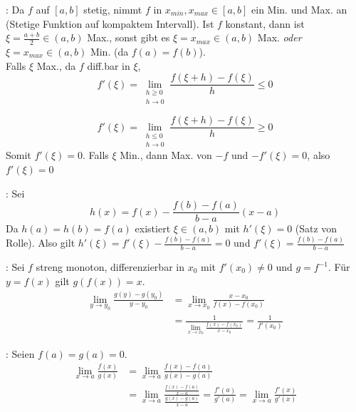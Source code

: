 \begin{minipage}{\linewidth}
\Bew {}: Da $f$ auf $[a, b]$ stetig, nimmt $f$ in $x_{min}, x_{max} \in [a, b]$
ein Min. und Max. an (Stetige Funktion auf kompaktem Intervall).
Ist $f$ konstant, dann ist $\xi = \frac{a + b}{2} \in (a,b)$ Max.,
sonst gibt es $\xi = x_{max} \in (a, b)$ Max. \textit{oder} $\xi = x_{max} \in (a, b)$ Min. (da $f(a) = f(b)$). \\
Falls $\xi$ Max., da $f$ diff.bar in $\xi$,
$$f'(\xi) = \lim_{\substack{h \ge 0 \\ h \to 0}} \frac{f(\xi + h) - f(\xi)}{h} \le 0$$

$$f'(\xi) = \lim_{\substack{h \le 0 \\ h \to 0}} \frac{f(\xi + h) - f(\xi)}{h} \ge 0$$
Somit $f'(\xi) = 0$. Falls $\xi$ Min., dann Max. von $-f$ und $-f'(\xi) = 0$, also $f'(\xi) = 0$
\end{minipage}

\begin{minipage}{\linewidth}
\Bew {}: Sei
$$h(x) = f(x) - \frac{f(b) - f(a)}{b - a} (x- a)$$
Da $h(a) = h(b) = f(a)$ existiert $\xi \in (a, b)$ mit $h'(\xi) = 0$ (Satz von Rolle).
Also gilt $h'(\xi) = f'(\xi) - \frac{f(b) - f(a)}{b - a} = 0$
und $f'(\xi) = \frac{f(b) - f(a)}{b - a}$
\end{minipage}

\begin{minipage}{\linewidth}
\Bew {}: Sei $f$ streng monoton, differenzierbar in $x_0$ mit $f'(x_0) \neq 0$ und $g = f^{-1}$. Für $y = f(x)$ gilt $g(f(x)) = x$.
\begin{align*}
    \lim_{y \to y_0} \frac{g(y) - g(y_0)}{y - y_0} &= \lim_{x \to x_0} \frac{x - x_0}{f(x) - f(x_0)} \\[-0.6em]
    &= \frac{1}{\lim_{x \to x_0} \frac{f(x) - f(x_0)}{x - x_0}} = \frac{1}{f'(x_0)}
\end{align*}
\end{minipage}

\Bew {}: Seien $f(a)=g(a)=0$.
\begin{align*}
    \lim_{x \to a} \frac{f(x)}{g(x)} &= \lim_{x \to a} \frac{f(x) - f(a)}{g(x) - g(a)} \\[-0.6em]
    &= \lim_{x \to a} \frac{\frac{f(x) - f(a)}{x - a}}{\frac{g(x) - g(a)}{x - a}} = \frac{f'(a)}{g'(a)} = \lim_{x \to a} \frac{f'(x)}{g'(x)}
\end{align*}

